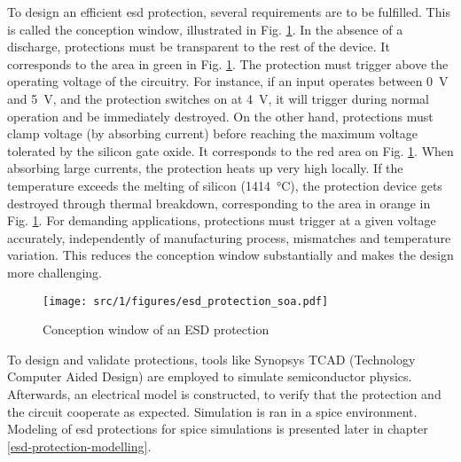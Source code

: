 To design an efficient \gls{esd} protection, several requirements are to be fulfilled.
This is called the conception window, illustrated in Fig. \ref{fig:soa-esd-protection}.
In the absence of a discharge, protections must be transparent to the rest of the device.
It corresponds to the area in green in Fig. \ref{fig:soa-esd-protection}.
The protection must trigger above the operating voltage of the circuitry.
For instance, if an input operates between \SI{0}{\volt} and \SI{5}{\volt}, and the protection switches on at \SI{4}{\volt}, it will trigger during normal operation and be immediately destroyed.
On the other hand, protections must clamp voltage (by absorbing current) before reaching the maximum voltage tolerated by the silicon gate oxide.
It corresponds to the red area on Fig. \ref{fig:soa-esd-protection}.
When absorbing large currents, the protection heats up very high locally.
If the temperature exceeds the melting of silicon (\SI{1414}{\degreeCelsius}), the protection device gets destroyed through thermal breakdown, corresponding to the area in orange in Fig. \ref{fig:soa-esd-protection}.
For demanding applications, protections must trigger at a given voltage accurately, independently of manufacturing process, mismatches and temperature variation.
This reduces the conception window substantially and makes the design more challenging.

\begin{figure}[!h]
  \centering
  \texttt{[image: src/1/figures/esd\_protection\_soa.pdf]}
  \caption{Conception window of an ESD protection}
  \label{fig:soa-esd-protection}
\end{figure}

To design and validate protections, tools like Synopsys TCAD (Technology Computer Aided Design) \cite{tcad} are employed to simulate semiconductor physics.
Afterwards, an electrical model is constructed, to verify that the protection and the circuit cooperate as expected.
Simulation is ran in a \gls{spice} environment.
Modeling of \gls{esd} protections for \gls{spice} simulations is presented later in chapter \ref{esd-protection-modelling}.
